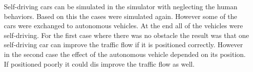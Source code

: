 Self-driving cars can be simulated in the simulator with neglecting the human behaviors. Based on this the cases were simulated again. However some of the cars were exchanged to autonomous vehicles. At the end all of the vehicles were self-driving. For the first case where there was no obstacle the result was that one self-driving car can improve the traffic flow if it is positioned correctly. However in the second case the effect of the autonomous vehicle depended on its position. If positioned poorly it could dis improve the traffic flow as well.